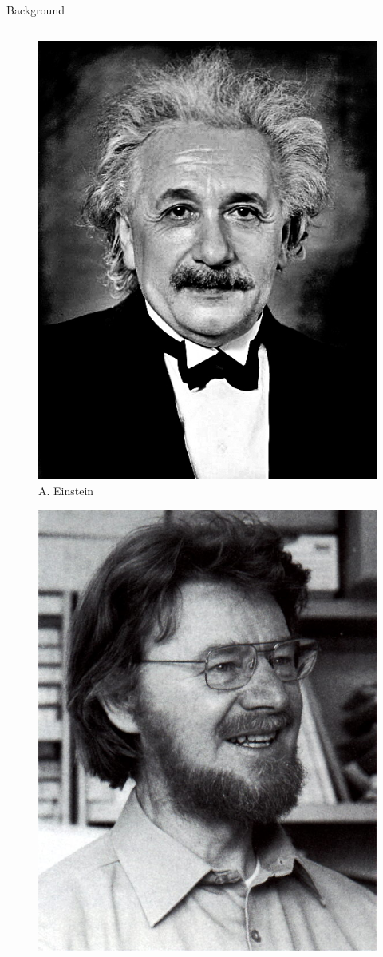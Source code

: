 \documentclass[final,hyperref={pdfpagelabels=false}]{beamer}
\begin{document}
\begin{frame}[t]
\begin{columns}[c]
\begin{column}{.32\textwidth}
\begin{block}{Background}
\begin{columns}
          \begin{column}{0.3\textwidth}
            \begin{figure}
              \includegraphics[width=0.8\linewidth]{einstein}
              \caption{A. Einstein}
            \end{figure}
            \begin{figure}
              \includegraphics[width=0.8\linewidth]{bell}

\end{figure}
\end{column}
\end{columns}
\end{block}
\end{column}
\end{columns}
\end{frame}
\end{document}
